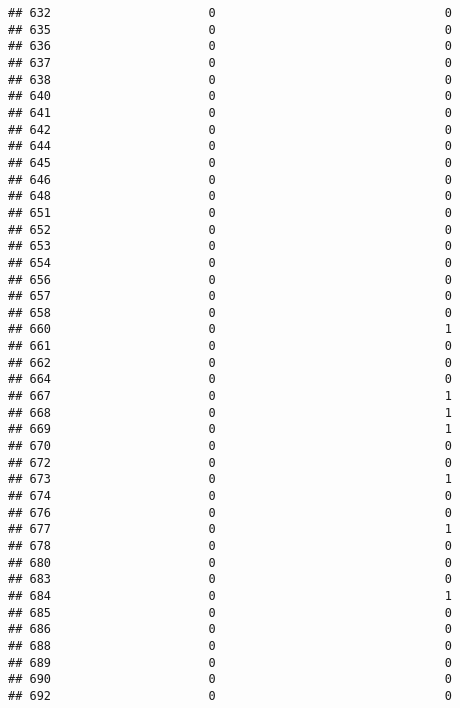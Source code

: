 \documentclass[
]{article}
\begin{document}
\begin{verbatim}
## 632                      0                                0
## 635                      0                                0
## 636                      0                                0
## 637                      0                                0
## 638                      0                                0
## 640                      0                                0
## 641                      0                                0
## 642                      0                                0
## 644                      0                                0
## 645                      0                                0
## 646                      0                                0
## 648                      0                                0
## 651                      0                                0
## 652                      0                                0
## 653                      0                                0
## 654                      0                                0
## 656                      0                                0
## 657                      0                                0
## 658                      0                                0
## 660                      0                                1
## 661                      0                                0
## 662                      0                                0
## 664                      0                                0
## 667                      0                                1
## 668                      0                                1
## 669                      0                                1
## 670                      0                                0
## 672                      0                                0
## 673                      0                                1
## 674                      0                                0
## 676                      0                                0
## 677                      0                                1
## 678                      0                                0
## 680                      0                                0
## 683                      0                                0
## 684                      0                                1
## 685                      0                                0
## 686                      0                                0
## 688                      0                                0
## 689                      0                                0
## 690                      0                                0
## 692                      0                                0

\end{verbatim}
\end{document}
